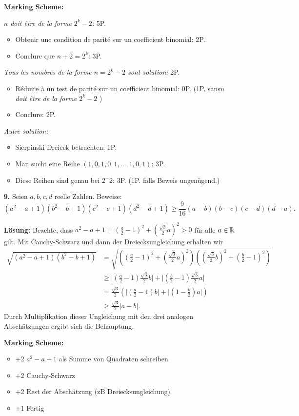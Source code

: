 \documentclass[language=german,style=solution]{smo}
\begin{document}
\begin{enumerate}
\textbf{Marking Scheme:}

\textit{$n$ doit être de la forme $2^k-2$:} 5P.
\begin{itemize}
	\item Obtenir une condition de parité sur un coefficient binomial: 2P.
	\item Conclure que $n+2 = 2^k$: 3P.
\end{itemize}
\textit{Tous les nombres de la forme $n = 2^k-2$ sont solution:} 2P.
\begin{itemize}
	\item Réduire à un test de parité sur un coefficient binomial: 0P. (1P. sans\textit{$n$ doit être de la forme $2^k-2$} )
	\item Conclure: 2P.
\end{itemize}
\textit{Autre solution:}
\begin{itemize}
	\item Sierpinski-Dreieck betrachten: 1P.
	\item Man sucht eine Reihe $(1,0,1,0,1,\ldots,1,0,1)$: 3P.
	\item Diese Reihen sind genau bei $2^-2$: 3P. (1P. falls Beweis ungenügend.)
\end{itemize}

\newpage

\item[\textbf{9.}] %
Seien $a,b,c,d$ reelle Zahlen. Beweise:
\[
(a^2-a+1)(b^2-b+1)(c^2-c+1)(d^2-d+1) \ge \frac{9}{16} (a-b)(b-c)(c-d)(d-a).
\]

\textbf{Lösung:} Beachte, dass $a^2-a+1=(\tfrac{a}{2}-1)^2+(\tfrac{\sqrt{3}}{2}a)^2>0$ für alle $a\in\mathbb{R}$ gilt. Mit Cauchy-Schwarz und dann der Dreiecksungleichung erhalten wir
\begin{align*}
\sqrt{(a^2-a+1)(b^2-b+1)}&=
\sqrt{\left((\tfrac{a}{2}-1)^2+(\tfrac{\sqrt{3}}{2}a)^2\right)\left( (\tfrac{\sqrt{3}}{2}b)^2+(\tfrac{b}{2}-1)^2\right)}\\
&\geq \lvert(\tfrac{a}{2}-1)\tfrac{\sqrt{3}}{2}b\rvert + \lvert(\tfrac{b}{2}-1)\tfrac{\sqrt{3}}{2}a\rvert\\
&=\tfrac{\sqrt{3}}{2}\left(\lvert(\tfrac{a}{2}-1)b\rvert+\lvert(1-\tfrac{b}{2})a\rvert\right)\\
&\geq \tfrac{\sqrt{3}}{2}\lvert a-b\rvert.
\end{align*}
Durch Multiplikation dieser Ungleichung mit den drei analogen Abschätzungen ergibt sich die Behauptung.
	

\textbf{Marking Scheme:}
\begin{itemize}
    \item +2 $a^2-a+1$ als Summe von Quadraten schreiben
    \item +2 Cauchy-Schwarz
    \item +2 Rest der Abschätzung (zB Dreiecksungleichung)
    \item +1 Fertig
\end{itemize}


\end{enumerate}
\end{document}
